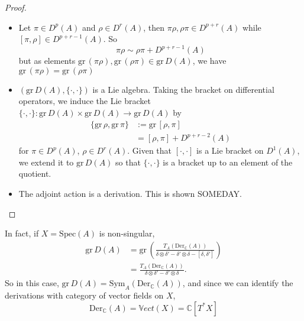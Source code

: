 \label{prop:grading_is_poisson}
\begin{proof}
\begin{itemize}
    \item Let $\pi \in D^p(A)$ and $\rho \in D^r(A)$, then $\pi \rho, \rho \pi \in D^{p+r}(A)$ while $[\pi, \rho] \in D^{p+r-1}(A)$.
    So 
    \begin{equation}
        \pi \rho \sim \rho \pi + D^{p+r-1}(A)
    \end{equation}
    but as elements $\mathrm{gr}\,(\pi \rho), \mathrm{gr}\,(\rho \pi) \in \mathrm{gr} \, D(A)$, we have $\mathrm{gr}\,(\pi \rho) = \mathrm{gr}\,(\rho \pi)$
    \item $\left(\mathrm{gr} \, D(A), \{\cdot, \cdot\} \right)$ is a Lie algebra. 
    Taking the bracket on differential operators, we induce the Lie bracket $\{\cdot,\cdot\} : \mathrm{gr}\, D(A) \times \mathrm{gr}\, D(A) \rightarrow \mathrm{gr}\, D(A) $ by 
    \begin{align*}
        \{\mathrm{gr} \,\rho, \mathrm{gr}\, \pi\} &:= \mathrm{gr}\,  [\rho, \pi] \\
        &= [\rho,\pi] + D^{p+r-2}(A)
    \end{align*}
    for $\pi \in D^p(A)$, $\rho \in D^r(A)$. Given that $[\cdot,\cdot]$ is a Lie bracket on $D^1(A)$, we extend it to $\mathrm{gr} \, D(A)$ so that $\{\cdot, \cdot\}$ is a bracket up to an element of the quotient. 
    \item The adjoint action is a derivation. This is shown SOMEDAY.
\end{itemize}

\end{proof}

In fact, if $X = \mathrm{Spec}(A)$ is non-singular,
\begin{align*}
    \mathrm{gr}\, D(A) &= \mathrm{gr}\, \left( \frac{T_A(\mathrm{Der}_\mathbb{C}(A))}{\delta \otimes \delta' - \delta' \otimes \delta - [\delta,\delta']}  \right)\\
    &= \frac{T_A(\mathrm{Der}_\mathbb{C}(A))}{\delta \otimes \delta' - \delta' \otimes \delta}.
\end{align*}
So in this case, $\mathrm{gr}\, D(A) = \mathrm{Sym}_A(\mathrm{Der}_\mathbb{C}(A))$, and since we can identify the derivations with category of vector fields on $X$,
\begin{equation}
    \mathrm{Der}_\mathbb{C}(A) = \mathbb{V}ect(X) = \mathbb{C}[T^*X]
\end{equation}

